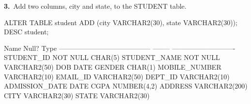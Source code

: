 
\noindent\begin{minipage}{\linewidth}
\begingroup{}
{\fontsize{14}{17}\selectfont\textbf{3.}}\ Add two columns, city and state, to the STUDENT table.\par
\endgroup\vspace{12pt}


\begin{sqlcode}
ALTER TABLE student ADD (city VARCHAR2(30), state VARCHAR2(30));
DESC student;
\end{sqlcode}

\vspace{18pt}


\begin{sqlout}
 Name                                      Null?    Type
 ----------------------------------------- -------- ----------------------------
 STUDENT_ID                                NOT NULL CHAR(5)
 STUDENT_NAME                              NOT NULL VARCHAR2(50)
 DOB                                                DATE
 GENDER                                             CHAR(1)
 MOBILE_NUMBER                                      VARCHAR2(10)
 EMAIL_ID                                           VARCHAR2(50)
 DEPT_ID                                            VARCHAR2(10)
 ADMISSION_DATE                                     DATE
 CGPA                                               NUMBER(4,2)
 ADDRESS                                            VARCHAR2(200)
 CITY                                               VARCHAR2(30)
 STATE                                              VARCHAR2(30)
\end{sqlout}
\end{minipage}\par\vspace{30pt}

